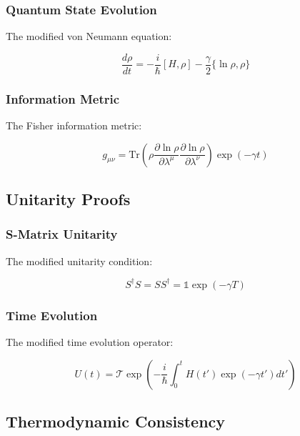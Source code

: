\documentclass[12pt]{article}
\theoremstyle{plain}
\theoremstyle{definition}
\theoremstyle{remark}
\begin{document}
\subsubsection{Quantum State Evolution}

The modified von Neumann equation:

\begin{equation}
\frac{d\rho}{dt} = -\frac{i}{\hbar}[H,\rho] - \frac{\gamma}{2}\{\ln\rho,\rho\}
\end{equation}

\subsubsection{Information Metric}

The Fisher information metric:

\begin{equation}
g_{\mu\nu} = \text{Tr}\left(\rho\frac{\partial\ln\rho}{\partial\lambda^\mu}\frac{\partial\ln\rho}{\partial\lambda^\nu}\right)\exp(-\gamma t)
\end{equation}

\subsection{Unitarity Proofs}

\subsubsection{S-Matrix Unitarity}

The modified unitarity condition:

\begin{equation}
S^\dagger S = SS^\dagger = \mathbb{1}\exp(-\gamma T)
\end{equation}

\subsubsection{Time Evolution}

The modified time evolution operator:

\begin{equation}
U(t) = \mathcal{T}\exp\left(-\frac{i}{\hbar}\int_0^t H(t')\exp(-\gamma t')dt'\right)
\end{equation}

\subsection{Thermodynamic Consistency}
\end{document}

